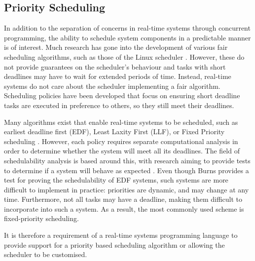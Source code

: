 \subsection{Priority Scheduling}
In addition to the separation of concerns in real-time systems through
concurrent programming, the ability to schedule system components in a
predictable manner is of interest.  Much research has gone into the development
of various fair scheduling algorithms, such as those of the Linux
scheduler \cite{6043273,7280991}. However, these do not provide guarantees on
the scheduler's behaviour and tasks with short deadlines may have to wait for
extended periods of time. Instead, real-time systems do not care about the
scheduler implementing a fair algorithm. Scheduling policies have been
developed that focus on ensuring short deadline tasks are executed in
preference to others, so they still meet their deadlines. 
\par\bigskip\noindent
Many algorithms exist that enable real-time systems to be
scheduled, such as earliest deadline first (EDF), Least Laxity First (LLF), or
Fixed Priority scheduling \cite{real-time-systems}.  However, each policy
requires separate computational analysis in order to determine whether the
system will meet all its deadlines.  The field of schedulability analysis is
based around this, with research aiming to provide tests to determine if a
system will behave as expected \cite{4815215,burns-sched-analysis}.  Even though 
Burns provides a test for proving the schedulability of EDF systems, such systems are
more difficult to implement in practice: priorities are dynamic, and may change
at any time. Furthermore, not all tasks may have a deadline, making them
difficult to incorporate into such a system.  As a result, the most commonly
used scheme is fixed-priority scheduling. 
\par\bigskip\noindent
It is therefore a requirement of a real-time systems programming language to provide
support for a priority based scheduling algorithm or allowing the scheduler to
be customised. 

